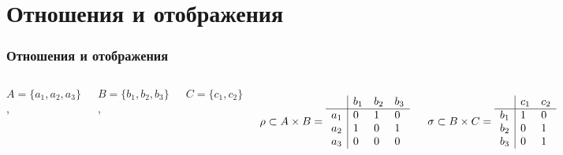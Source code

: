 \documentclass[24pt,pdf,hyperref={unicode}]{beamer}
\begin{document}
\section{Отношения и отображения}

\begin{frame}\frametitle{Отношения и отображения}
\begin{columns}
$
A=\{a_1,a_2, a_3\}$, 

$B=\{b_1,b_2,b_3\}$, 

$C=\{c_1,c_2\}$

$$
\rho\subset A \times B=
\begin{array}{l|l l l}
    & b_1 & b_2 & b_3 \\
\hline
a_1 &  0  &  1 & 0 \\
a_2 &  1  &  0 & 1 \\
a_3 &  0  &  0 & 0 \\
\end{array}
$$

$$
\sigma\subset B \times C =
\begin{array}{l|l l l}
    & c_1 & c_2 \\
\hline
b_1 &  1  &  0 \\
b_2 &  0  &  1 \\
b_3 &  0  &  1 \\
\end{array}
$$



\end{columns}
\end{frame}
\end{document}
